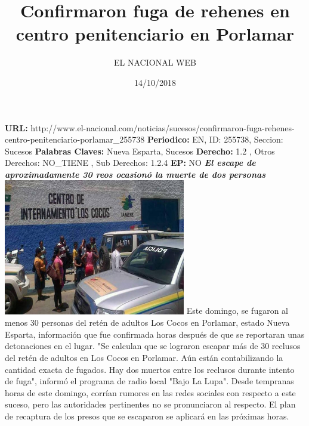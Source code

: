 \documentclass{article}%
\title{\textbf{Confirmaron fuga de rehenes en centro penitenciario en Porlamar}}%
\author{EL NACIONAL WEB}%
\date{14/10/2018}%
\begin{document}
%
\normalsize%
\maketitle%
\textbf{URL: }%
http://www.el{-}nacional.com/noticias/sucesos/confirmaron{-}fuga{-}rehenes{-}centro{-}penitenciario{-}porlamar\_255738\newline%
%
\textbf{Periodico: }%
EN, %
ID: %
255738, %
Seccion: %
Sucesos\newline%
%
\textbf{Palabras Claves: }%
Nueva Esparta, Sucesos\newline%
%
\textbf{Derecho: }%
1.2%
, Otros Derechos: %
NO\_TIENE%
, Sub Derechos: %
1.2.4%
\newline%
%
\textbf{EP: }%
NO\newline%
\newline%
%
\textbf{\textit{El escape de aproximadamente 30 reos ocasionó la muerte de dos personas}}%
\newline%
\newline%
%
\includegraphics[width=300px]{115.jpg}%
\newline%
%
Este domingo, se fugaron al menos 30 personas del retén de adultos Los Cocos en Porlamar, estado Nueva Esparta, información que fue confirmada horas después de que se reportaran unas detonaciones en el lugar.%
\newline%
%
"Se calculan que se lograron escapar más de 30 reclusos del retén de adultos en Los Cocos en Porlamar. Aún están contabilizando la cantidad exacta de fugados. Hay dos muertos entre los reclusos durante intento de fuga", informó el programa de radio local "Bajo La Lupa".%
\newline%
%
Desde tempranas horas de este domingo, corrían rumores en las redes sociales con respecto a este suceso, pero las autoridades pertinentes no se pronunciaron al respecto.%
\newline%
%
El plan de recaptura de los presos que se escaparon se aplicará en las próximas horas.%
\newline%
%
\end{document}
